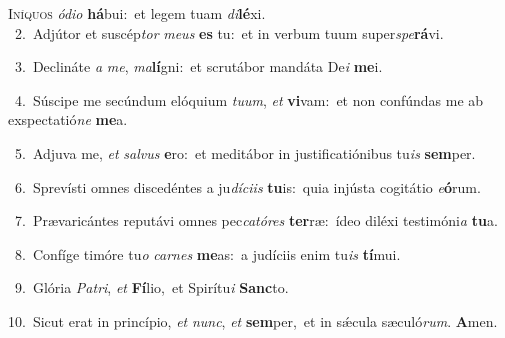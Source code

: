 \lettrine{\initial\textcolor{\initialcolor}{I}}{níquos} \textit{ó}\-\textit{di}\textit{o} \textbf{há}\-bui:~\star et legem tuam \textit{di}\-\textbf{lé}xi.\\
{\numbfont\textcolor{\numbcolor}{~2.}}~Adjútor et suscép\textit{tor} \textit{me}\-\textit{us} \textbf{es} tu:~\star et in verbum tuum super\-\textit{spe}\-\textbf{rá}vi.\par
{\numbfont\textcolor{\numbcolor}{~3.}}~Declináte \textit{a} \textit{me}\-, \textit{ma}\-\textbf{lí}gni:~\star et scrutábor mandáta De\textit{i} \textbf{me}\-i.\par
{\numbfont\textcolor{\numbcolor}{~4.}}~Súscipe me secúndum elóquium \textit{tu}\-\textit{um}, \textit{et} \textbf{vi}\-vam:~\star et non confúndas me ab exspectatió\textit{ne} \textbf{me}\-a.\par
{\numbfont\textcolor{\numbcolor}{~5.}}~Adjuva me, \textit{et} \textit{sal}\-\textit{vus} \textbf{e}\-ro:~\star et meditábor in justificatiónibus tu\textit{is} \textbf{sem}\-per.\par
{\numbfont\textcolor{\numbcolor}{~6.}}~Sprevísti omnes discedéntes a ju\-\textit{dí}\-\textit{ci}\textit{is} \textbf{tu}\-is:~\star quia injústa cogitátio \textit{e}\-\textbf{ó}rum.\par
{\numbfont\textcolor{\numbcolor}{~7.}}~Prævaricántes reputávi omnes pec\-\textit{ca}\-\textit{tó}\textit{res} \textbf{ter}\-ræ:~\star ídeo diléxi testimóni\textit{a} \textbf{tu}\-a.\par
{\numbfont\textcolor{\numbcolor}{~8.}}~Confíge timóre tu\textit{o} \textit{car}\-\textit{nes} \textbf{me}\-as:~\star a judíciis enim tu\textit{is} \textbf{tí}\-mui.\par
{\numbfont\textcolor{\numbcolor}{~9.}}~Glória \textit{Pa}\-\textit{tri}, \textit{et} \textbf{Fí}\-lio,~\star et Spirítu\textit{i} \textbf{Sanc}\-to.\par
{\numbfont\textcolor{\numbcolor}{10.}}~Sicut erat in princípio, \textit{et} \textit{nunc}\-, \textit{et} \textbf{sem}\-per,~\star et in sǽcula sæculó\-\textit{rum}\-. \textbf{A}\-men.\par
